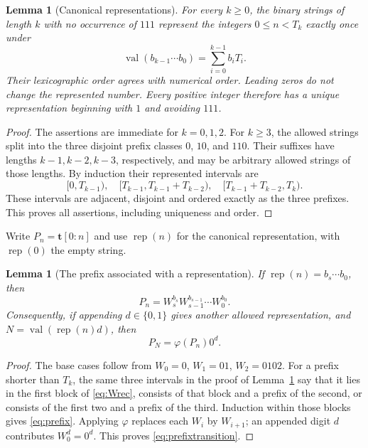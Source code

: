 \documentclass[11pt,a4paper]{article}
\newtheorem{lemma}[theorem]{Lemma}
\theoremstyle{definition}
\theoremstyle{remark}
\newcommand{\ttt}{\mathbf t}
\newcommand{\rep}{\operatorname{rep}}
\newcommand{\val}{\operatorname{val}}
\begin{document}
\begin{lemma}[Canonical representations]\label{lem:numeration}
For every $k\ge0$, the binary strings of length $k$ with no occurrence of
$111$ represent the integers $0\le n<T_k$ exactly once under
\[
 \val(b_{k-1}\cdots b_0)=\sum_{i=0}^{k-1}b_iT_i.
\]
Their lexicographic order agrees with numerical order. Leading zeros do not
change the represented number. Every positive integer therefore has a unique
representation beginning with $1$ and avoiding $111$.
\end{lemma}
\begin{proof}
The assertions are immediate for $k=0,1,2$. For $k\ge3$, the allowed strings
split into the three disjoint prefix classes $0$, $10$, and $110$.
Their suffixes have lengths $k-1,k-2,k-3$, respectively, and may be arbitrary
allowed strings of those lengths. By induction their represented intervals
are
\[
 [0,T_{k-1}),\quad
 [T_{k-1},T_{k-1}+T_{k-2}),\quad
 [T_{k-1}+T_{k-2},T_k).
\]
These intervals are adjacent, disjoint and ordered exactly as the three
prefixes. This proves all assertions, including uniqueness and order.
\end{proof}

Write $P_n=\ttt[0:n]$ and use $\rep(n)$ for the canonical representation,
with $\rep(0)$ the empty string.

\begin{lemma}[The prefix associated with a representation]\label{lem:prefix}
If $\rep(n)=b_s\cdots b_0$, then
\begin{equation}\label{eq:prefix}
 P_n=W_s^{b_s}W_{s-1}^{b_{s-1}}\cdots W_0^{b_0}.
\end{equation}
Consequently, if appending $d\in\{0,1\}$ gives another allowed
representation, and $N=\val(\rep(n)d)$, then
\begin{equation}\label{eq:prefixtransition}
 P_N=\varphi(P_n)0^d.
\end{equation}
\end{lemma}
\begin{proof}
The base cases follow from $W_0=0$, $W_1=01$, $W_2=0102$.
For a prefix shorter than $T_k$, the same three intervals in the proof of
Lemma~\ref{lem:numeration} say that it lies in the first block of
\eqref{eq:Wrec}, consists of that block and a prefix of the second, or
consists of the first two and a prefix of the third. Induction within those
blocks gives \eqref{eq:prefix}. Applying $\varphi$ replaces each $W_i$
by $W_{i+1}$; an appended digit $d$ contributes $W_0^d=0^d$.
This proves \eqref{eq:prefixtransition}.
\end{proof}
\end{document}
